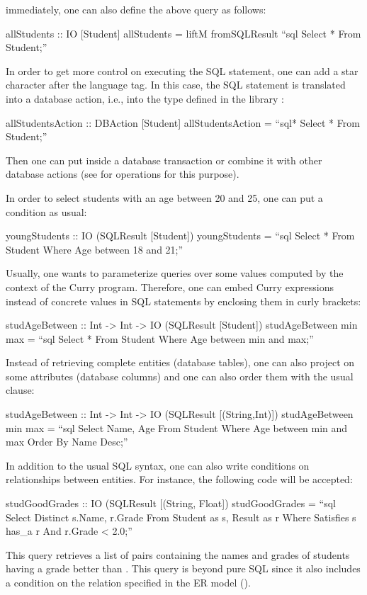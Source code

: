 immediately, one can also define the above query as follows:
%
\begin{curry}
allStudents :: IO [Student]
allStudents = liftM fromSQLResult ``sql Select * From Student;''
\end{curry}
%
In order to get more control on executing the SQL statement,
one can add a star character after the language tag.
In this case, the SQL statement is translated into a database action,
i.e., into the type  defined in the \CYS library
:
%
\begin{curry}
allStudentsAction :: DBAction [Student]
allStudentsAction = ``sql* Select * From Student;''
\end{curry}
%
Then one can put  inside a database transaction
or combine it with other database actions (see 
for operations for this purpose).

In order to select students with an age between 20 and 25,
one can put a condition as usual:
%
\begin{curry}
youngStudents :: IO (SQLResult [Student])
youngStudents = ``sql Select * From Student
                      Where Age between 18 and 21;''
\end{curry}
%
Usually, one wants to parameterize queries over some values
computed by the context of the Curry program.
Therefore, one can embed Curry expressions instead of concrete
values in SQL statements by enclosing them in curly brackets:
%
\begin{curry}
studAgeBetween :: Int -> Int -> IO (SQLResult [Student])
studAgeBetween min max =
  ``sql Select * From Student
        Where Age between {min} and {max};''
\end{curry}
%
Instead of retrieving complete entities (database tables),
one can also project on some attributes (database columns)
and one can also order them with the usual  clause:
%
\begin{curry}
studAgeBetween :: Int -> Int -> IO (SQLResult [(String,Int)])
studAgeBetween min max =
  ``sql Select Name, Age
        From Student Where Age between {min} and {max}
        Order By Name Desc;''
\end{curry}
%
In addition to the usual SQL syntax, one can also
write conditions on relationships between entities.
For instance, the following code will be accepted:
%
\begin{curry}
studGoodGrades :: IO (SQLResult [(String, Float])
studGoodGrades = ``sql Select Distinct s.Name, r.Grade 
                       From Student as s, Result as r
                       Where Satisfies s has_a r And r.Grade < 2.0;''
\end{curry}
%
This query retrieves a list of pairs containing the
names and grades of students having a grade better than .
This query is beyond pure SQL since it also includes
a condition on the relation  specified in the ER model
().

